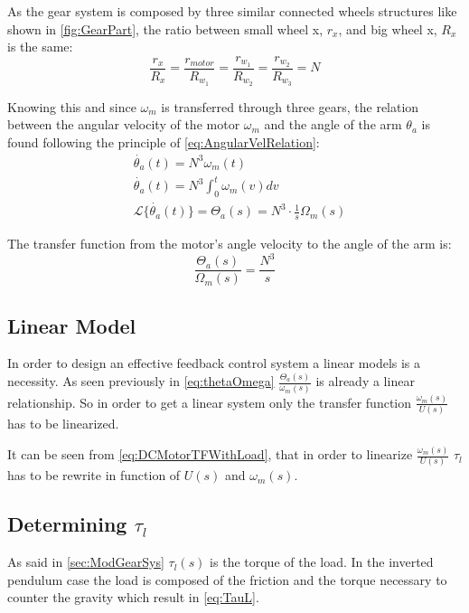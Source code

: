 As the gear system is composed by three similar connected wheels structures like shown in \autoref{fig:GearPart}, the ratio between small wheel x, $r_x$, and big wheel x, $R_x$ is the same:
\begin{equation}
	\frac{r_x}{R_x} = \frac{r_{motor}}{R_{w_1}} = \frac{r_{w_1}}{R_{w_2}} = \frac{r_{w_2}}{R_{w_3}} = N
\end{equation}

Knowing this and since $\omega_m$ is transferred through three gears, the relation between the angular velocity of the motor $\omega_m$ and the angle of the arm $\theta_a$ is found following the principle of \autoref{eq:AngularVelRelation}:
\begin{subequations} \label{eq:tech_ToA}
	\begin{flalign}
		&\dot{\theta_a}(t) = N^3 \omega_m(t) \\
		&\dot{\theta_a}(t) = N^3 \int_{0}^{t}\omega_m(v) dv \\
		&\mathscr{L}\{\dot{\theta_a}(t)\} = \Theta_a(s) = N^3 \cdot \frac{1}{s} \Omega_m(s)
	\end{flalign}
\end{subequations}

The transfer function from the motor's angle velocity to the angle of the arm is:
\begin{equation}\label{eq:thetaOmega}
	\frac{\Theta_a(s)}{\Omega_m(s)} =  \frac{N^3}{s}
\end{equation}

\subsection{Linear Model}

In order to design an effective feedback control system a linear models is a necessity. As seen previously in \autoref{eq:thetaOmega} $\frac{\Theta_a(s)}{\omega_m(s)}$ is already a linear relationship. So in order to get a linear system only the transfer function $\frac{\omega_m(s)}{U(s)}$ has to be linearized.

It can be seen from \autoref{eq:DCMotorTFWithLoad}, that in order to linearize $\frac{\omega_m(s)}{U(s)}$ $\tau_l$ has to be rewrite in function of $U(s)$ and $\omega_m(s)$.

\subsection{Determining $\tau_l$}
As said in \autoref{sec:ModGearSys} $\tau_l(s)$ is the torque of the load. In the inverted pendulum case the load is composed of the friction and the torque necessary to counter the gravity which result in \autoref{eq:TauL}.

